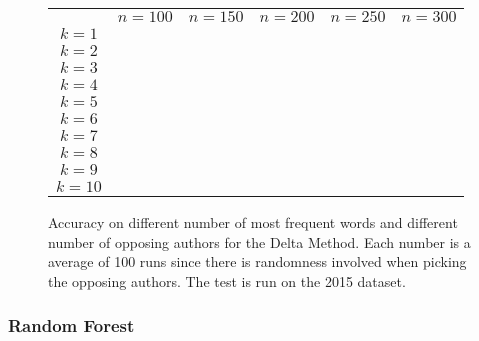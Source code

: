 \begin{figure}
    \begin{tabular}{cccccc}
               & $n=100$ & $n=150$ & $n=200$ & $n=250$ & $n=300$ \\
        $k=1$  &         &         &         &         &         \\
        $k=2$  &         &         &         &         &         \\
        $k=3$  &         &         &         &         &         \\
        $k=4$  &         &         &         &         &         \\
        $k=5$  &         &         &         &         &         \\
        $k=6$  &         &         &         &         &         \\
        $k=7$  &         &         &         &         &         \\
        $k=8$  &         &         &         &         &         \\
        $k=9$  &         &         &         &         &         \\
        $k=10$ &         &         &         &         &
    \end{tabular}
    \caption{Accuracy on different number of most frequent words and different
        number of opposing authors for the Delta Method. Each number is a
        average of 100 runs since there is randomness involved when picking the
        opposing authors. The test is run on the 2015 dataset.}
\end{figure}

\subsubsection{Random Forest}

